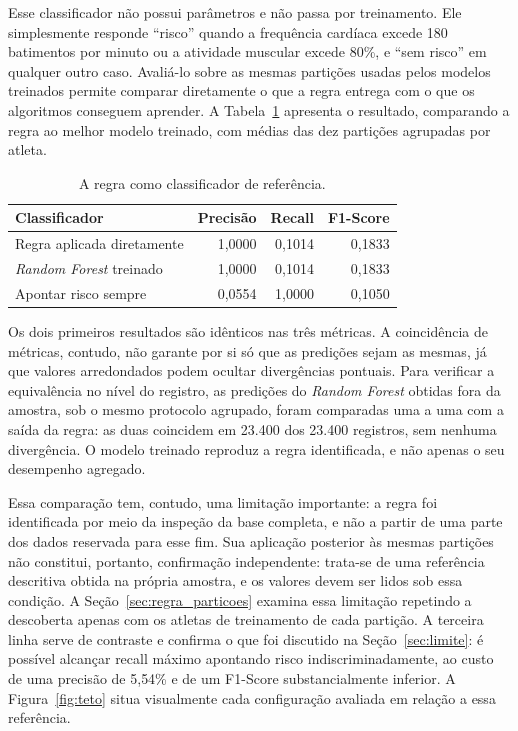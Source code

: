 Esse classificador não possui parâmetros e não passa por treinamento. Ele simplesmente responde ``risco'' quando a frequência cardíaca excede 180 batimentos por minuto ou a atividade muscular excede 80\%, e ``sem risco'' em qualquer outro caso. Avaliá-lo sobre as mesmas partições usadas pelos modelos treinados permite comparar diretamente o que a regra entrega com o que os algoritmos conseguem aprender. A Tabela~\ref{tab:oraculo} apresenta o resultado, comparando a regra ao melhor modelo treinado, com médias das dez partições agrupadas por atleta.

\begin{table}[H]
\centering
\caption{A regra como classificador de referência.}
\label{tab:oraculo}
\begin{tabular}{lrrr}
\toprule
Classificador & Precisão & Recall & F1-Score \\
\midrule
Regra aplicada diretamente      & 1{,}0000 & 0{,}1014 & 0{,}1833 \\
\textit{Random Forest} treinado & 1{,}0000 & 0{,}1014 & 0{,}1833 \\
\addlinespace
Apontar risco sempre            & 0{,}0554 & 1{,}0000 & 0{,}1050 \\
\bottomrule
\end{tabular}
\end{table}

Os dois primeiros resultados são idênticos nas três métricas. A coincidência de métricas, contudo, não garante por si só que as predições sejam as mesmas, já que valores arredondados podem ocultar divergências pontuais. Para verificar a equivalência no nível do registro, as predições do \textit{Random Forest} obtidas fora da amostra, sob o mesmo protocolo agrupado, foram comparadas uma a uma com a saída da regra: as duas coincidem em 23.400 dos 23.400 registros, sem nenhuma divergência. O modelo treinado reproduz a regra identificada, e não apenas o seu desempenho agregado.

Essa comparação tem, contudo, uma limitação importante: a regra foi identificada por meio da inspeção da base completa, e não a partir de uma parte dos dados reservada para esse fim. Sua aplicação posterior às mesmas partições não constitui, portanto, confirmação independente: trata-se de uma referência descritiva obtida na própria amostra, e os valores devem ser lidos sob essa condição. A Seção~\ref{sec:regra_particoes} examina essa limitação repetindo a descoberta apenas com os atletas de treinamento de cada partição. A terceira linha serve de contraste e confirma o que foi discutido na Seção~\ref{sec:limite}: é possível alcançar recall máximo apontando risco indiscriminadamente, ao custo de uma precisão de 5{,}54\% e de um F1-Score substancialmente inferior. A Figura~\ref{fig:teto} situa visualmente cada configuração avaliada em relação a essa referência.

